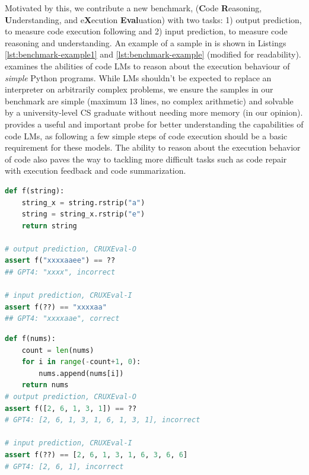 Motivated by this, we contribute a new benchmark, \benchmark (\textbf{C}ode \textbf{R}easoning, \textbf{U}nderstanding, and e\textbf{X}ecution \textbf{Eval}uation) with two tasks: 1) output prediction, \benchmarko to measure code execution following and 2) input prediction, \benchmarki to measure code reasoning and understanding. An example of a sample in \benchmark is shown in Listings \ref{lst:benchmark-example1} and \ref{lst:benchmark-example} (modified for readability). \benchmark examines the abilities of code LMs to reason about the execution behaviour of \textit{simple} Python programs. While LMs shouldn't be expected to replace an interpreter on arbitrarily complex problems, we ensure the samples in our benchmark are simple (maximum 13 lines, no complex arithmetic) and solvable by a university-level CS graduate without needing more memory (in our opinion). \benchmark provides a useful and important probe for better understanding the capabilities of code LMs, as following a few simple steps of code execution should be a basic requirement for these models. The ability to reason about the execution behavior of code also paves the way to tackling more difficult tasks such as code repair with execution feedback and code summarization. 


\begin{minipage}{.48\textwidth}
\begin{lstlisting}[caption={Sample problem},label={lst:benchmark-example1}, captionpos=t, breaklines=true, language=Python]
def f(string):
    string_x = string.rstrip("a")
    string = string_x.rstrip("e")
    return string

# output prediction, CRUXEval-O
assert f("xxxxaaee") == ??
## GPT4: "xxxx", incorrect

# input prediction, CRUXEval-I
assert f(??) == "xxxxaa"
## GPT4: "xxxxaae", correct
\end{lstlisting}
\end{minipage}\hfill
\begin{minipage}{.48\textwidth}
\begin{lstlisting}[caption={Sample problem},label={lst:benchmark-example}, captionpos=t, breaklines=true, language=python]
def f(nums):
    count = len(nums)
    for i in range(-count+1, 0):
        nums.append(nums[i])
    return nums
# output prediction, CRUXEval-O
assert f([2, 6, 1, 3, 1]) == ??
# GPT4: [2, 6, 1, 3, 1, 6, 1, 3, 1], incorrect

# input prediction, CRUXEval-I
assert f(??) == [2, 6, 1, 3, 1, 6, 3, 6, 6]
# GPT4: [2, 6, 1], incorrect
\end{lstlisting}
\end{minipage}





